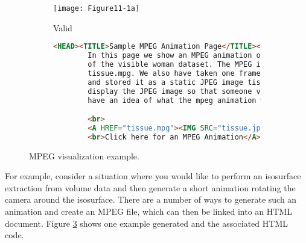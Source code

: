 
\begin{figure}[htb]
    \centering
	\begin{subfigure}[h]{0.96\linewidth}
		\texttt{[image: Figure11-1a]}
		\captionsetup{justification=centering}
		\caption*{Valid}
		\label{fig:Figure11-1a}
	\end{subfigure}
	\hfill
	\begin{subfigure}[h]{0.96\linewidth}
       \begin{lstlisting}[language=HTML,  caption={}, numbers=none, frame=none]
        <HEAD><TITLE>Sample MPEG Animation Page</TITLE></HEAD>
        In this page we show an MPEG animation of a visualization
        of the visible woman dataset. The MPEG is stored in a file
        tissue.mpg. We also have taken one frame from the animation
        and stored it as a static JPEG image tissue.jpg. We
        display the JPEG image so that someone visiting the site will
        have an idea of what the mpeg animation will contain.

        <br>
        <A HREF="tissue.mpg"><IMG SRC="tissue.jpg">
        <br>Click here for an MPEG Animation</A>
        \end{lstlisting}
        \label{fig:Figure11-1d}
	\end{subfigure}
	\caption{MPEG visualization example.}\label{fig:Figure11-1}
\end{figure}

For example, consider a situation where you would like to perform an isosurface extraction from volume data and then generate a short animation rotating the camera around the isosurface. There are a number of ways to generate such an animation and create an MPEG file, which can then be linked into an HTML document. Figure \ref{fig:Figure11-1} shows one example generated and the associated HTML code.

